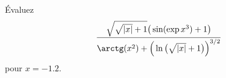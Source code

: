\begin{exercice}\label{exoSC_serie1-0001}

	Évaluez
	\begin{equation}
		\frac{  \sqrt{\sqrt{| x |}+1}\big( \sin(\exp x^3)+1 \big)    }{ \arctg(x^2)+\Big( \ln\big( \sqrt{| x |}+1 \big) \Big)^{3/2} }
	\end{equation}
	pour $x=-1.2$.

\end{exercice}
